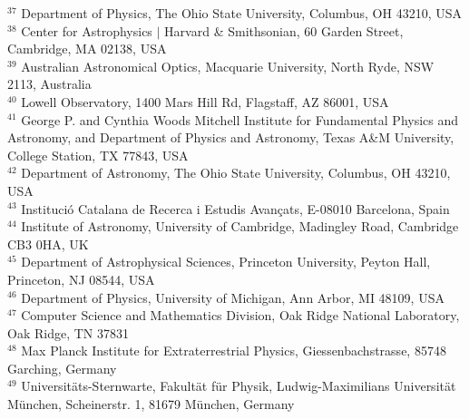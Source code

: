 {$^{37}$ Department of Physics, The Ohio State University, Columbus, OH 43210, USA\\
$^{38}$ Center for Astrophysics $\vert$ Harvard \& Smithsonian, 60 Garden Street, Cambridge, MA 02138, USA\\
$^{39}$ Australian Astronomical Optics, Macquarie University, North Ryde, NSW 2113, Australia\\
$^{40}$ Lowell Observatory, 1400 Mars Hill Rd, Flagstaff, AZ 86001, USA\\
$^{41}$ George P. and Cynthia Woods Mitchell Institute for Fundamental Physics and Astronomy, and Department of Physics and Astronomy, Texas A\&M University, College Station, TX 77843,  USA\\
$^{42}$ Department of Astronomy, The Ohio State University, Columbus, OH 43210, USA\\
$^{43}$ Instituci\'o Catalana de Recerca i Estudis Avan\c{c}ats, E-08010 Barcelona, Spain\\
$^{44}$ Institute of Astronomy, University of Cambridge, Madingley Road, Cambridge CB3 0HA, UK\\
$^{45}$ Department of Astrophysical Sciences, Princeton University, Peyton Hall, Princeton, NJ 08544, USA\\
$^{46}$ Department of Physics, University of Michigan, Ann Arbor, MI 48109, USA\\
$^{47}$ Computer Science and Mathematics Division, Oak Ridge National Laboratory, Oak Ridge, TN 37831\\
$^{48}$ Max Planck Institute for Extraterrestrial Physics, Giessenbachstrasse, 85748 Garching, Germany\\
$^{49}$ Universit\"ats-Sternwarte, Fakult\"at f\"ur Physik, Ludwig-Maximilians Universit\"at M\"unchen, Scheinerstr. 1, 81679 M\"unchen, Germany\\
}
